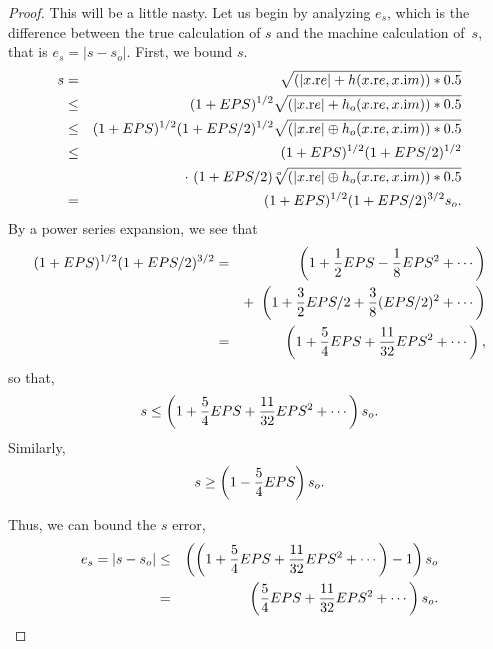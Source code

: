 \begin{proof}{}
This will be a little nasty.  Let us begin by analyzing $e_s$, which is the difference between the true calculation of $s$ and
the machine calculation of~$s$, that is $e_s = |s - s_o|.$   First, we bound $s.$
\begin{eqnarray*}
s &=& \sqrt{(|x.{\mathrm re}| + h(x.{\mathrm re},x.{\mathrm im})) * 0.5}\\
&\le& (1+EPS)^{1/2} \sqrt{(|x.{\mathrm re}| + h_o(x.{\mathrm re},x.{\mathrm im}))
* 0.5}\\
&\le& (1+EPS)^{1/2} (1+EPS/2)^{1/2}
\sqrt{(|x.{\mathrm re}| \oplus h_o(x.{\mathrm re},x.{\mathrm im})) * 0.5}\\
&\le& (1+EPS)^{1/2} (1+EPS/2)^{1/2}\\
&&\cdot\ (1+EPS/2)
\root o \of {(|x.{\mathrm re}| \oplus h_o(x.{\mathrm re},x.{\mathrm im})) * 0.5}\\
&=& (1+EPS)^{1/2} (1+EPS/2)^{3/2} s_o.
\end{eqnarray*}
By a power series expansion, we see that
\begin{eqnarray*}
(1+EPS)^{1/2} (1+EPS/2)^{3/2}&=&\left(1 + {1 \over 2} EPS - {1 \over 8} EPS^2 + \cdots\right)\\
&& +\
     \left(1 + {3 \over 2} EPS/2 + {3 \over 8} (EPS/2)^2 +\cdots\right)\\
&=&\left(1 + {5 \over 4} EPS + {11 \over 32} EPS^2 +\cdots\right),
\end{eqnarray*}
so that,
$$s \le \left(1 + {5 \over 4} EPS + {11 \over 32} EPS^2 + \cdots\right) s_o.$$
Similarly, 
$$s \ge \left(1 - {5 \over 4} EPS\right) s_o.$$

Thus, we can bound the $s$ error, 
\begin{eqnarray*}
e_s = |s - s_o|&\le&\left(\left(1 + {5 \over 4} EPS + {11 \over 32} EPS^2 +\cdots\right) - 1\right) s_o\\
&=& \left({5 \over 4} EPS +
{11 \over 32} EPS^2 +\cdots\right) s_o.
\end{eqnarray*}


\end{proof}
